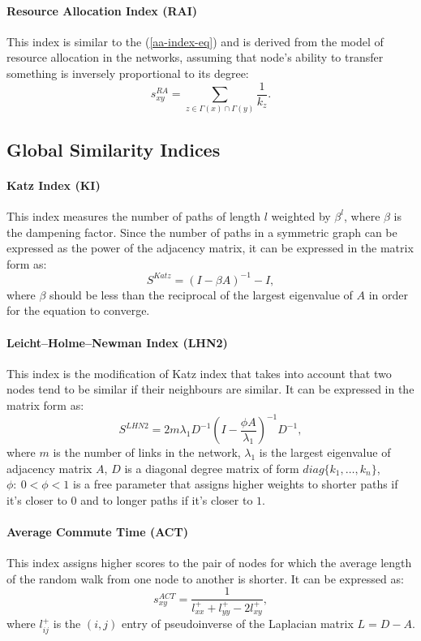 \documentclass{llncs}
\begin{document}
\paragraph{Resource Allocation Index (RAI) \cite{rai-index}}
%
This index is similar to the (\ref{aa-index-eq}) and is derived from the model of resource allocation in the networks, assuming that node's ability to transfer something is inversely proportional to its degree:
\begin{equation}
s_{xy}^{RA} = \sum_{z \in \Gamma(x) \cap \Gamma(y)} \frac{1}{k_z}.
\end{equation}
%
\subsection{Global Similarity Indices}
%
\paragraph{Katz Index (KI) \cite{katz-index}}
%
This index measures the number of paths of length $l$ weighted by $\beta^l$, where $\beta$ is the dampening factor. Since the number of paths in a symmetric graph can be expressed as the power of the adjacency matrix, it can be expressed in the matrix form as:
\begin{equation}
S^{Katz} = (I - \beta A)^{-1} - I,
\end{equation}
where $\beta$ should be less than the reciprocal of the largest eigenvalue of $A$ in order for the equation to converge.
%
\paragraph{Leicht–Holme–Newman Index (LHN2) \cite{lhn1-index}}
%
This index is the modification of Katz index that takes into account that two nodes tend to be similar if their neighbours are similar. It can be expressed in the matrix form \cite{survey} as:
\begin{equation}
S^{LHN2} = 2 m \lambda_1 D^{-1} (I - \frac{\phi A}{\lambda_1})^{-1} D^{-1},
\end{equation}
where $m$ is the number of links in the network, $\lambda_1$ is the largest eigenvalue of adjacency matrix $A$, $D$ is a diagonal degree matrix of form $diag\{k_1, \ldots, k_n\}$, $\phi : \ 0 < \phi < 1$ is a free parameter that assigns higher weights to shorter paths if it's closer to $0$ and to longer paths if it's closer to $1$.
%
\paragraph{Average Commute Time (ACT)}
%
This index assigns higher scores to the pair of nodes for which the average length of the random walk from one node to another is shorter. It can be expressed as:
\begin{equation}
s_{xy}^{ACT} = \frac{1}{l_{xx}^{+} + l_{yy}^{+} - 2l_{xy}^{+}},
\end{equation}
where $l_{ij}^{+}$ is the $(i, j)$ entry of pseudoinverse of the Laplacian matrix $L = D - A$.
%
\end{document}
